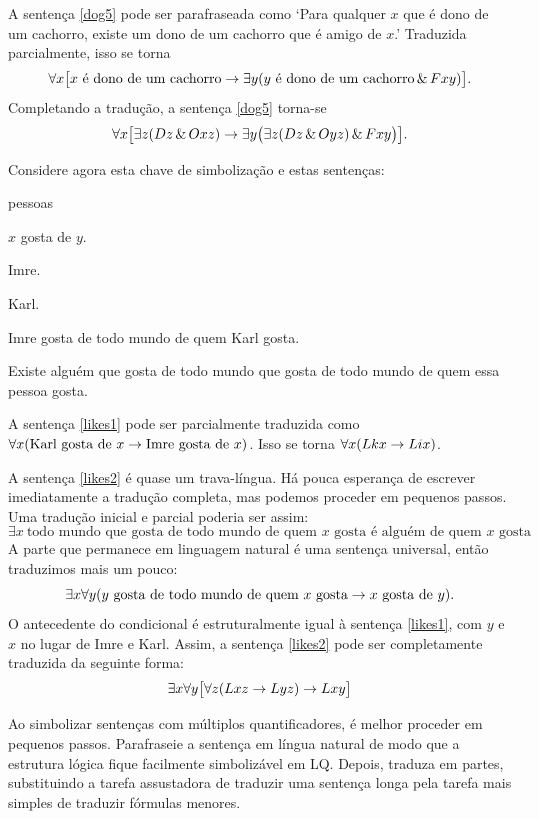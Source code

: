 A sentença \ref{dog5} pode ser parafraseada como `Para qualquer $x$ que é dono de um cachorro, existe um dono de um cachorro que é amigo de $x$.' Traduzida parcialmente, isso se torna
$$\forall x\bigl[\mbox{$x$ é dono de um cachorro}\rightarrow\exists y(\mbox{$y$ é dono de um cachorro}\,\&\, Fxy)\bigr].$$
Completando a tradução, a sentença \ref{dog5} torna-se
$$\forall x\bigl[\exists z(Dz \,\&\, Oxz)\rightarrow\exists y\bigl(\exists z(Dz \,\&\, Oyz)\,\&\, Fxy\bigr)\bigr].$$

Considere agora esta chave de simbolização e estas sentenças:
\begin{ekey}
\item[UD:] pessoas
\item[Lxy:] $x$ gosta de $y$.
\item[i:] Imre.
\item[k:] Karl.
\end{ekey}
\begin{earg}
\item[\ex{likes1}] Imre gosta de todo mundo de quem Karl gosta.
\item[\ex{likes2}] Existe alguém que gosta de todo mundo que gosta de todo mundo de quem essa pessoa gosta.
\end{earg}

A sentença \ref{likes1} pode ser parcialmente traduzida como $\forall x(\mbox{Karl gosta de $x$}\rightarrow\mbox{Imre gosta de $x$})$. Isso se torna $\forall x(Lkx\rightarrow Lix)$.

A sentença \ref{likes2} é quase um trava-língua. Há pouca esperança de escrever imediatamente a tradução completa, mas podemos proceder em pequenos passos. Uma tradução inicial e parcial poderia ser assim:
$$\exists x\ \mbox{todo mundo que gosta de todo mundo de quem $x$ gosta é alguém de quem $x$ gosta}$$
A parte que permanece em linguagem natural é uma sentença universal, então traduzimos mais um pouco:
$$\exists x\forall y(\mbox{$y$ gosta de todo mundo de quem $x$ gosta}\rightarrow\mbox{$x$ gosta de $y$}).$$
O antecedente do condicional é estruturalmente igual à sentença \ref{likes1}, com $y$ e $x$ no lugar de Imre e Karl. Assim, a sentença \ref{likes2} pode ser completamente traduzida da seguinte forma:
$$\exists x\forall y\bigl[\forall z(Lxz \rightarrow Lyz) \rightarrow Lxy\bigr]$$

Ao simbolizar sentenças com múltiplos quantificadores, é melhor proceder em pequenos passos. Parafraseie a sentença em língua natural de modo que a estrutura lógica fique facilmente simbolizável em LQ. Depois, traduza em partes, substituindo a tarefa assustadora de traduzir uma sentença longa pela tarefa mais simples de traduzir fórmulas menores.


